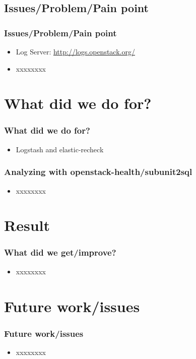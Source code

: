 \documentclass[aspectratio=169,11pt,hyperref={colorlinks=true}]{beamer}
\begin{document}
\subsection{Issues/Problem/Pain point}
\begin{frame}
    \frametitle{Issues/Problem/Pain point}
    \begin{itemize}
        \item Log Server: \href{http://logs.openstack.org/}{http://logs.openstack.org/}
        \item xxxxxxxx
    \end{itemize}
\end{frame}

\section{What did we do for?}
\begin{frame}
    \frametitle{What did we do for?}
    \begin{itemize}
        \item Logstash and elastic-recheck
    \end{itemize}
\end{frame}

\begin{frame}
    \frametitle{Analyzing with openstack-health/subunit2sql}
    \begin{itemize}
        \item xxxxxxxx
    \end{itemize}
\end{frame}

\section{Result}
\begin{frame}
    \frametitle{What did we get/improve?}
    \begin{itemize}
        \item xxxxxxxx
    \end{itemize}
\end{frame}

\section{Future work/issues}
\begin{frame}
    \frametitle{Future work/issues}
    \begin{itemize}
        \item xxxxxxxx
    \end{itemize}
\end{frame}
\end{document}
